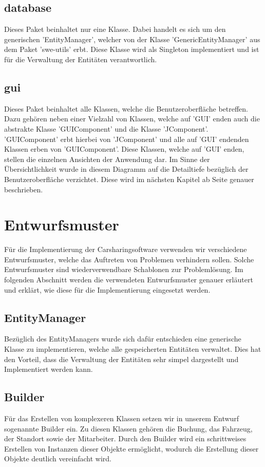 \subsection{database}
Dieses Paket beinhaltet nur eine Klasse. Dabei handelt es sich um den generischen 'EntityManager', welcher von der Klasse 'GenericEntityManager' aus dem Paket 'swe-utils' erbt. Diese Klasse wird als Singleton implementiert und ist für die Verwaltung der Entitäten verantwortlich.

\subsection{gui}
Dieses Paket beinhaltet alle Klassen, welche die Benutzeroberfläche betreffen. Dazu gehören neben einer Vielzahl von Klassen, welche auf 'GUI' enden auch die abstrakte Klasse 'GUIComponent' und die Klasse 'JComponent'. 'GUIComponent' erbt hierbei von 'JComponent' und alle auf 'GUI' endenden Klassen erben von 'GUIComponent'. Diese Klassen, welche auf 'GUI' enden, stellen die einzelnen Ansichten der Anwendung dar. Im Sinne der Übersichtlichkeit wurde in diesem Diagramm auf die Detailtiefe bezüglich der Benutzeroberfläche verzichtet. Diese wird im nächsten Kapitel ab Seite \pageref{chapter:gui} genauer beschrieben.

\section{Entwurfsmuster}
Für die Implementierung der Carsharingsoftware verwenden wir verschiedene Entwurfsmuster, welche das Auftreten von Problemen verhindern sollen. Solche Entwurfsmuster sind wiederverwendbare Schablonen zur Problemlösung. Im folgenden Abschnitt werden die verwendeten Entwurfsmuster genauer erläutert und erklärt, wie diese für die Implementierung eingesetzt werden. 

\subsection{EntityManager}
Bezüglich des EntityManagers wurde sich dafür entschieden eine generische Klasse zu implementieren, welche alle gespeicherten Entitäten verwaltet. Dies hat den Vorteil, dass die Verwaltung der Entitäten sehr simpel dargestellt und Implementiert werden kann.

\subsection{Builder}
Für das Erstellen von komplexeren Klassen setzen wir in unserem Entwurf sogenannte Builder ein. Zu diesen Klassen gehören die Buchung, das Fahrzeug, der Standort sowie der Mitarbeiter. Durch den Builder wird ein schrittweises Erstellen von Instanzen dieser Objekte ermöglicht, wodurch die Erstellung dieser Objekte deutlich vereinfacht wird.

